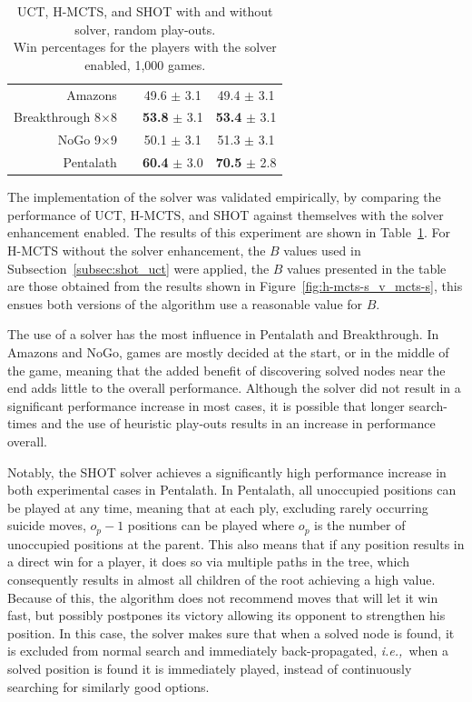 \documentclass{kecsmstr}
\newcommand{\ie}{{\it i.e.,}~}
\begin{document}
\begin{table}[ht]
{\begin{tabular}{rlcc}
Amazons &\multicolumn{1}{l|}{}			    	& 49.6 $\pm$ 3.1 				& 49.4 $\pm$ 3.1 					\\ [.5mm] 
Breakthrough 8$\times$8 &\multicolumn{1}{l|}{}	& {\bf{53.8}} $\pm$ 3.1			& {\bf{53.4}} $\pm$ 3.1 			\\ [.5mm] 
NoGo 9$\times$9 &\multicolumn{1}{l|}{} 			& 50.1 $\pm$ 3.1				& 51.3 $\pm$ 3.1 					\\ [.5mm] 
Pentalath &\multicolumn{1}{l|}{} 		  		& {\bf{60.4}} $\pm$ 3.0			& {\bf{70.5}} $\pm$ 2.8 			\\ [.5mm] 
\hline
\end{tabular}
}
\vspace{3mm}
{\caption[H-MCTS, SHOT, and UCT with and without solver.]
{UCT, H-MCTS, and SHOT with and without solver, random play-outs. \\ Win percentages for the players with the solver enabled, 1,000 games.} \label{tab:solver_no_solver}}
\end{table}

The implementation of the solver was validated empirically, by comparing the performance of UCT, H-MCTS, and SHOT against themselves with the solver enhancement enabled. The results of this experiment are shown in Table~\ref{tab:solver_no_solver}. For H-MCTS without the solver enhancement, the $B$ values used in Subsection~\ref{subsec:shot_uct} were applied, the $B$ values presented in the table are those obtained from the results shown in Figure~\ref{fig:h-mcts-s_v_mcts-s}, this ensues both versions of the algorithm use a reasonable value for $B$.

The use of a solver has the most influence in Pentalath and Breakthrough. In Amazons and NoGo, games are mostly decided at the start, or in the middle of the game, meaning that the added benefit of discovering solved nodes near the end adds little to the overall performance. Although the solver did not result in a significant performance increase in most cases, it is possible that longer search-times and the use of heuristic play-outs results in an increase in performance overall.

Notably, the SHOT solver achieves a significantly high performance increase in both experimental cases in Pentalath. In Pentalath, all unoccupied positions can be played at any time, meaning that at each ply, excluding rarely occurring suicide moves, $o_p-1$ positions can be played where $o_p$ is the number of unoccupied positions at the parent. This also means that if any position results in a direct win for a player, it does so via multiple paths in the tree, which consequently results in almost all children of the root achieving a high value. Because of this, the algorithm does not recommend moves that will let it win fast, but possibly postpones its victory allowing its opponent to strengthen his position. In this case, the solver makes sure that when a solved node is found, it is excluded from normal search and immediately back-propagated, \ie when a solved position is found it is immediately played, instead of continuously searching for similarly good options.
\end{document}

